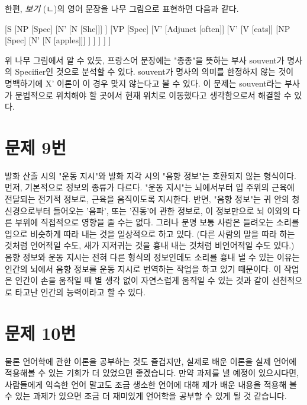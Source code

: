 \documentclass{article}
\begin{document}
        한편, \emph{보기} (ㄴ)의 영어 문장을 나무 그림으로 표현하면 다음과 같다.
        
        [S
            [NP
                [Spec]
                [N' [N [She]]]
            ]
            [VP
                [Spec]
                [V'
                    [Adjunct [often]]
                    [V'
                        [V [eats]]
                            [NP
                                [Spec]
                                [N' [N [apples]]]
                            ]
                    ]
                ]
            ]
        ]
        
        위 나무 그림에서 알 수 있듯, 프랑스어 문장에는 "종종"을 뜻하는 부사 souvent가 명사의 Specifier인 것으로 분석할 수 있다. souvent가 명사의 의미를 한정하지 않는 것이 명백하기에 X' 이론이 이 경우 맞지 않는다고 볼 수 있다. 이 문제는 souvent라는 부사가 문법적으로 위치해야 할 곳에서 현재 위치로 이동했다고 생각함으로서 해결할 수 있다.
    
    \section{문제 9번}
    
        발화 산출 시의 "운동 지시"와 발화 지각 시의 "음향 정보"는 호환되지 않는 형식이다. 먼저, 기본적으로 정보의 종류가 다르다. "운동 지시"는 뇌에서부터 입 주위의 근육에 전달되는 전기적 정보로, 근육을 움직이도록 지시한다. 반면, "음향 정보"는 귀 안의 청신경으로부터 들어오는 '음파', 또는 '진동'에 관한 정보로, 이 정보만으로 뇌 이외의 다른 부위에 직접적으로 영향을 줄 수는 없다. 그러나 분명 보통 사람은 들려오는 소리를 입으로 비슷하게 따라 내는 것을 일상적으로 하고 있다. (다른 사람의 말을 따라 하는 것처럼 언어적일 수도, 새가 지저귀는 것을 흉내 내는 것처럼 비언어적일 수도 있다.) 음향 정보와 운동 지시는 전혀 다른 형식의 정보인데도 소리를 흉내 낼 수 있는 이유는 인간의 뇌에서 음향 정보를 운동 지시로 번역하는 작업을 하고 있기 때문이다. 이 작업은 인간이 손을 움직일 때 별 생각 없이 자연스럽게 움직일 수 있는 것과 같이 선천적으로 타고난 인간의 능력이라고 할 수 있다.
    
    \section{문제 10번}
    
        물론 언어학에 관한 이론을 공부하는 것도 즐겁지만, 실제로 배운 이론을 실제 언어에 적용해볼 수 있는 기회가 더 있었으면 좋겠습니다. 만약 과제를 낼 예정이 있으시다면, 사람들에게 익숙한 언어 말고도 조금 생소한 언어에 대해 제가 배운 내용을 적용해 볼 수 있는 과제가 있으면 조금 더 재미있게 언어학을 공부할 수 있게 될 것 같습니다.
        
\end{document}
